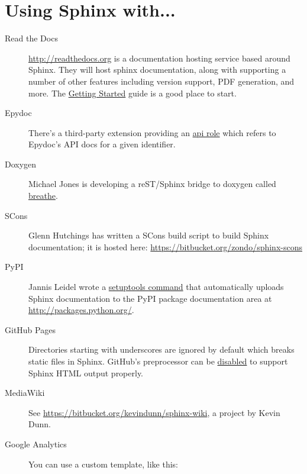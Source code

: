 \documentclass[letterpaper,10pt,english]{sphinxmanual}
\begin{document}
\section{Using Sphinx with...}
\label{faq:using-sphinx-with}\label{faq:usingwith}\begin{description}
\item[{Read the Docs}] \leavevmode
\url{http://readthedocs.org} is a documentation hosting service based around Sphinx.
They will host sphinx documentation, along with supporting a number of other
features including version support, PDF generation, and more. The \href{http://read-the-docs.readthedocs.org/en/latest/getting\_started.html}{Getting
Started}
guide is a good place to start.

\item[{Epydoc}] \leavevmode
There's a third-party extension providing an \href{http://git.savannah.gnu.org/cgit/kenozooid.git/tree/doc/extapi.py}{api role} which refers to
Epydoc's API docs for a given identifier.

\item[{Doxygen}] \leavevmode
Michael Jones is developing a reST/Sphinx bridge to doxygen called \href{http://github.com/michaeljones/breathe/tree/master}{breathe}.

\item[{SCons}] \leavevmode
Glenn Hutchings has written a SCons build script to build Sphinx
documentation; it is hosted here: \url{https://bitbucket.org/zondo/sphinx-scons}

\item[{PyPI}] \leavevmode
Jannis Leidel wrote a \href{http://pypi.python.org/pypi/Sphinx-PyPI-upload}{setuptools command} that automatically uploads
Sphinx documentation to the PyPI package documentation area at
\url{http://packages.python.org/}.

\item[{GitHub Pages}] \leavevmode
Directories starting with underscores are ignored by default which breaks
static files in Sphinx.  GitHub's preprocessor can be \href{https://github.com/blog/572-bypassing-jekyll-on-github-pages}{disabled} to support
Sphinx HTML output properly.

\item[{MediaWiki}] \leavevmode
See \url{https://bitbucket.org/kevindunn/sphinx-wiki}, a project by Kevin Dunn.

\item[{Google Analytics}] \leavevmode
You can use a custom  template, like this:


\end{description}
\end{document}
